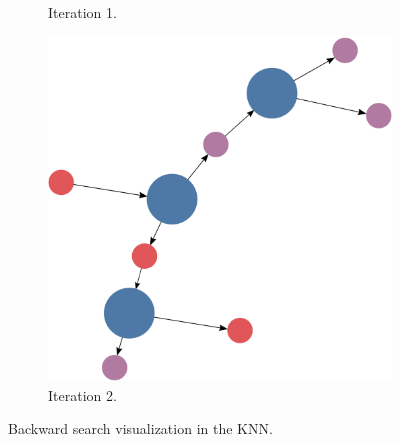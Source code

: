 \documentclass[titlepage,11pt]{article}
\begin{document}
\begin{figure}[!htb]
\begin{subfigure}[!htb]{0.32\textwidth}
		\caption{Iteration 1.}
	\end{subfigure}
	\begin{subfigure}[!htb]{0.32\textwidth}
		\centering
		\includegraphics[width=\columnwidth]{figures/knn_simple_backward_think_2.pdf}
		\caption{Iteration 2.}
	\end{subfigure}
	\caption{Backward search visualization in the KNN.}
	\label{fig:backward_search_test}
\end{figure}
\end{document}
